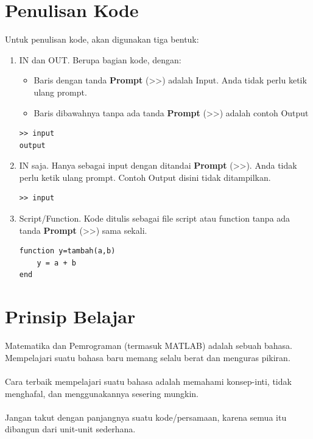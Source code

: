 \documentclass[12pt]{book}
\begin{document}
	\section{Penulisan Kode} 
	Untuk penulisan kode, akan digunakan tiga bentuk:
	\begin{enumerate}
		\item IN dan OUT. Berupa bagian kode, dengan:
		\begin{itemize}
			\item Baris dengan tanda \textbf{Prompt} (>>) adalah Input.
			Anda tidak perlu ketik ulang prompt.
			\item Baris dibawahnya tanpa ada tanda \textbf{Prompt} (>>) adalah contoh Output
		\end{itemize}
	
		\begin{verbatim}
>> input
output
		\end{verbatim}
	
		\item IN saja. Hanya sebagai input dengan ditandai \textbf{Prompt} (>>).
		Anda tidak perlu ketik ulang prompt.
		Contoh Output disini tidak ditampilkan.
		
		\begin{verbatim}
>> input
		\end{verbatim}
	
		\newpage
		\item Script/Function. Kode ditulis sebagai file script atau function tanpa ada tanda \textbf{Prompt} (>>) sama sekali.
		
		\begin{verbatim}
function y=tambah(a,b)
	y = a + b
end
		\end{verbatim}
	\end{enumerate}

	\section{Prinsip Belajar}
	
	Matematika dan Pemrograman (termasuk MATLAB) adalah sebuah bahasa.
	Mempelajari suatu bahasa baru memang selalu berat dan menguras pikiran.
	\\
	\\
	Cara terbaik mempelajari suatu bahasa adalah memahami konsep-inti, tidak menghafal,
	dan menggunakannya sesering mungkin.
	\\
	\\
	Jangan takut dengan panjangnya suatu kode/persamaan,
	karena semua itu dibangun dari unit-unit sederhana.
	
\end{document}

